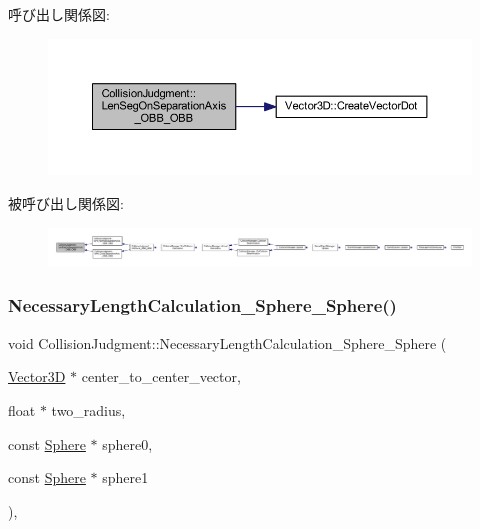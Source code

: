 呼び出し関係図\+:\nopagebreak
\begin{figure}[H]
\begin{center}
\leavevmode
\includegraphics[width=350pt]{class_collision_judgment_ac9e908375427b6b00bd82e2f5a5b034a_cgraph}
\end{center}
\end{figure}
被呼び出し関係図\+:
\nopagebreak
\begin{figure}[H]
\begin{center}
\leavevmode
\includegraphics[width=350pt]{class_collision_judgment_ac9e908375427b6b00bd82e2f5a5b034a_icgraph}
\end{center}
\end{figure}
\mbox{\label{class_collision_judgment_a987df18ee059d409ebb64ea67c6e2777}} 
\subsubsection{\texorpdfstring{Necessary\+Length\+Calculation\+\_\+\+Sphere\+\_\+\+Sphere()}{NecessaryLengthCalculation\_Sphere\_Sphere()}}
{\footnotesize\ttfamily void Collision\+Judgment\+::\+Necessary\+Length\+Calculation\+\_\+\+Sphere\+\_\+\+Sphere (\begin{DoxyParamCaption}\item[{\mbox{\hyperlink{class_vector3_d}{Vector3D}} $\ast$}]{center\+\_\+to\+\_\+center\+\_\+vector,  }\item[{float $\ast$}]{two\+\_\+radius,  }\item[{const \mbox{\hyperlink{class_sphere}{Sphere}} $\ast$}]{sphere0,  }\item[{const \mbox{\hyperlink{class_sphere}{Sphere}} $\ast$}]{sphere1 }\end{DoxyParamCaption})\hspace{0.3cm}{\ttfamily [static]}, {\ttfamily [private]}}



